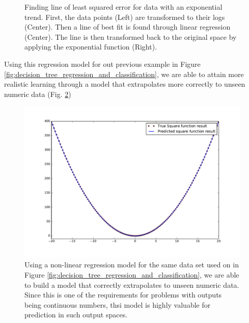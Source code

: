 \begin{figure}[!h]
\begin{subfigure}{0.32\textwidth}
    \end{subfigure}
  \caption{Finding line of least squared error for data with an exponential trend. First, the data points (Left) are transformed to their logs (Center). Then a line of best fit is found through linear regression (Center). The line is then transformed back to the original space by applying the exponential function (Right).}
  \label{fig:log_regression}
\end{figure}

Using this regression model for out previous example in Figure \ref{fig:decision_tree_regression_and_classification}, we are able to attain more realistic learning through a model that extrapolates more correctly to unseen numeric data (Fig. \ref{fig:regression_on_square_function})

\begin{figure}[!h]
  \centering
    \includegraphics[width=0.7\linewidth]{figures/reg_ridge_plot.pdf}
  \caption{Using a non-linear regression model for the same data set used on in Figure \ref{fig:decision_tree_regression_and_classification}, we are able to build a model that correctly extrapolates to unseen numeric data. Since this is one of the requirements for problems with outputs being continuous numbers, thsi model is highly valuable for prediction in such output spaces.}
  \label{fig:regression_on_square_function}
\end{figure}
